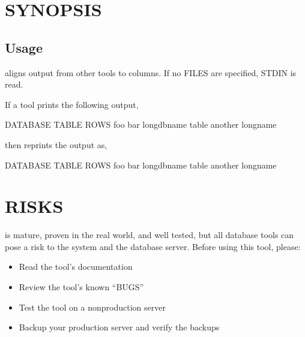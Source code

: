 \documentclass[letterpaper,10pt,english]{sphinxmanual}
\begin{document}
\section{SYNOPSIS}
\label{\detokenize{mariadb-align-output:synopsis}}

\subsection{Usage}
\label{\detokenize{mariadb-align-output:usage}}
\begin{sphinxVerbatim}[commandchars=\\\{\}]
 \PYG{p}{[}\PYG{p}{]}
\end{sphinxVerbatim}

 aligns output from other tools to columns.  If no FILES are specified,
STDIN is read.

If a tool prints the following output,

\begin{sphinxVerbatim}[commandchars=\\\{\}]
DATABASE TABLE   ROWS
foo      bar      
long\PYGZus{}db\PYGZus{}name table  
another  long\PYGZus{}name 
\end{sphinxVerbatim}

then  reprints the output as,

\begin{sphinxVerbatim}[commandchars=\\\{\}]
DATABASE     TABLE     ROWS
foo          bar        
long\PYGZus{}db\PYGZus{}name table        
another      long\PYGZus{}name  
\end{sphinxVerbatim}


\section{RISKS}
\label{\detokenize{mariadb-align-output:risks}}
 is mature, proven in the real world, and well tested,
but all database tools can pose a risk to the system and the database
server.  Before using this tool, please:
\begin{itemize}
\item {} 
Read the tool’s documentation

\item {} 
Review the tool’s known “BUGS”

\item {} 
Test the tool on a non\sphinxhyphen{}production server

\item {} 
Backup your production server and verify the backups

\end{itemize}
\end{document}
